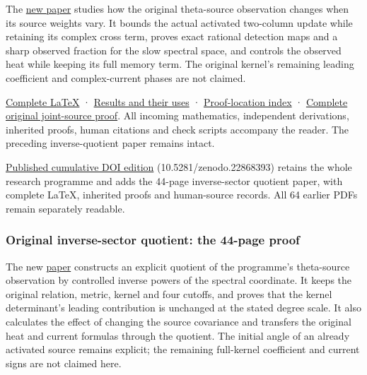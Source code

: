 \documentclass[
]{article}
\begin{document}
The
\href{https://github.com/KokunoYumeto/zeta-function-research-reader/blob/main/workbenches/splitzero-tandem/continuations/20260921-uniform-source-family/UNIFORM_SOURCE_FAMILY_COMPLETE_READER.pdf}{new
paper} studies how the original theta-source observation changes when
its source weights vary. It bounds the actual activated two-column
update while retaining its complex cross term, proves exact rational
detection maps and a sharp observed fraction for the slow spectral
space, and controls the observed heat while keeping its full memory
term. The original kernel's remaining leading coefficient and
complex-current phases are not claimed.

\href{https://github.com/KokunoYumeto/zeta-function-research-reader/blob/main/workbenches/splitzero-tandem/continuations/20260921-uniform-source-family/UNIFORM_SOURCE_FAMILY_COMPLETE_READER.tex}{Complete
LaTeX} ·
\href{https://github.com/KokunoYumeto/zeta-function-research-reader/blob/main/workbenches/splitzero-tandem/continuations/20260921-uniform-source-family/RESULTS_20260921_014.md}{Results
and their uses} ·
\href{https://github.com/KokunoYumeto/zeta-function-research-reader/blob/main/workbenches/splitzero-tandem/continuations/20260921-uniform-source-family/RESULT_INDEX.json}{Proof-location
index} ·
\href{https://github.com/KokunoYumeto/zeta-function-research-reader/blob/main/workbenches/splitzero-tandem/continuations/20260921-uniform-source-family/JOINT_MINIMUM_COMPLETE.tex}{Complete
original joint-source proof}. All incoming mathematics, independent
derivations, inherited proofs, human citations and check scripts
accompany the reader. The preceding inverse-quotient paper remains
intact.

\href{https://zenodo.org/records/22868393}{Published cumulative DOI
edition} (10.5281/zenodo.22868393) retains the whole research programme
and adds the 44-page inverse-sector quotient paper, with complete LaTeX,
inherited proofs and human-source records. All 64 earlier PDFs remain
separately readable.

\subsubsection{Original inverse-sector quotient: the 44-page
proof}\label{original-inverse-sector-quotient-the-44-page-proof}

The new
\href{https://github.com/KokunoYumeto/zeta-function-research-reader/blob/main/workbenches/splitzero-tandem/continuations/20260921-inverse-quotient/INVERSE_QUOTIENT_COMPLETE_READER.pdf}{paper}
constructs an explicit quotient of the programme's theta-source
observation by controlled inverse powers of the spectral coordinate. It
keeps the original relation, metric, kernel and four cutoffs, and proves
that the kernel determinant's leading contribution is unchanged at the
stated degree scale. It also calculates the effect of changing the
source covariance and transfers the original heat and current formulas
through the quotient. The initial angle of an already activated source
remains explicit; the remaining full-kernel coefficient and current
signs are not claimed here.
\end{document}
